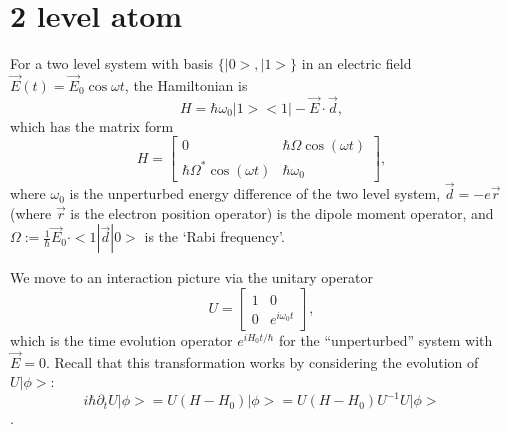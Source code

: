\documentclass[aps,twocolumn,prb,floatfix,amsmath,amssymb,groupedaddress]{revtex4}
\begin{document}
\section{2 level atom}
For a two level system with basis $\{|0>,|1>\}$ in an electric field $\vec{E}(t) = \vec{E}_0 \cos{\omega t}$, the Hamiltonian is \[H = \hbar\omega_0 |1><1| - \vec{E}\cdot\vec{d},\] which has the matrix form \[
H = 
\begin{bmatrix}
0 & \hbar\Omega \cos(\omega t) \\
\hbar \Omega^* \cos(\omega t) & \hbar \omega_0 
\end{bmatrix},
\] where $\omega_0$ is the unperturbed energy difference of the two level system, $\vec{d}=-e\vec{r}$ (where $\vec{r}$ is the electron position operator) is the dipole moment operator, and $\Omega:=\frac{1}{\hbar}\vec{E}_0\cdot <1|\vec{d}|0>$ is the `Rabi frequency'.

We move to an interaction picture via the unitary operator \[U = 
\begin{bmatrix}
1 & 0 \\
0 & e^{i\omega_0 t}
\end{bmatrix},
\] which is the time evolution operator $e^{iH_0 t/\hbar}$ for the ``unperturbed'' system with $\vec{E}=0$.  Recall that this transformation works by considering the evolution of $U|\phi>$: \[i\hbar\partial_t U |\phi> = U \left(H - H_0\right) |\phi> = U \left(H - H_0\right)U^{-1} U |\phi>\].
\end{document}
